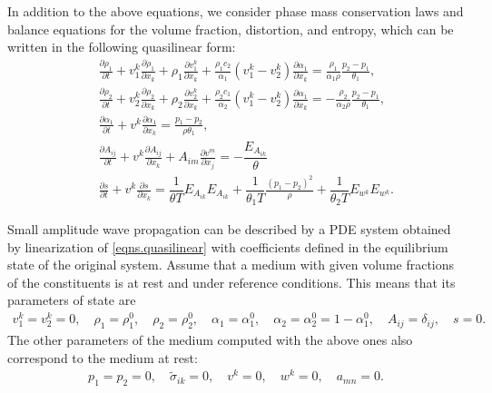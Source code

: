 \documentclass[3p,times,table]{article}
\begin{document}
In addition to the above equations, we consider phase mass conservation 
laws 
and balance equations for the volume fraction, distortion, and entropy, which can be 
written in the following quasilinear form:
\begin{subequations}\label{eqns.quasilinear}
	\begin{eqnarray} 
&&\frac{\partial \rho_1}{\partial t}+v^k_1\frac{\partial \rho_1}{\partial 
x_k}+\rho_1 \frac{\partial v^k_1}{\partial x_k}+
\frac{\rho_1c_2}{\alpha_1}(v^k_1-v^k_2)\frac{\partial \alpha_1}{\partial x_k}=
\frac{\rho_1}{\alpha_1 \rho} \frac{p_2-p_1}{\theta_1},   \\
&&\frac{\partial \rho_2}{\partial t}+v^k_2\frac{\partial \rho_2}{\partial 
x_k}+\rho_2 \frac{\partial v^k_2}{\partial x_k}+
\frac{\rho_2c_1}{\alpha_2}(v^k_1-v^k_2)\frac{\partial \alpha_1}{\partial x_k}=
-\frac{\rho_2}{\alpha_2 \rho} \frac{p_2-p_1}{\theta_1},   \\
&&\frac{\partial \alpha_1}{\partial t}+v^k\frac{\partial \alpha_1}{\partial 
x_k}=
\frac{p_1-p_2}{\rho \theta_1},  \\
&&\frac{\partial A_{i j}}{\partial t}+v^k \frac{\partial A_{ij}}{\partial x_k}
+A_{im}\frac{\partial v^m}{\partial x_j}
=-\dfrac{ E_{A_{ik}} }{\theta}  \\
&&\frac{\partial s}{\partial t}+v^k\frac{\partial s}{\partial x_k}=
\dfrac{1}{\theta T} E_{A_{ik}}E_{A_{ik}} +
\dfrac{1}{\theta_1 T}\frac{(p_1-p_2)^2}{\rho} +
\dfrac{1}{\theta_2 T} E_{w^k}E_{w^k}.  
\end{eqnarray}

\end{subequations}

Small amplitude wave propagation can be described by a PDE system obtained by 
linearization of \eqref{eqns.quasilinear} with coefficients defined in 
the equilibrium state of the original system. Assume that a medium with 
given volume fractions of the constituents is at rest and under reference 
conditions. This means that its parameters of state are
\begin{align}  \label{static.solution}
v_1^k=v_2^k=0, \quad \rho_1=\rho_1^0, \quad \rho_2=\rho_2^0, 
\quad \alpha_1=\alpha_1^0, \quad \alpha_2=\alpha_2^0 = 1-\alpha_1^0, \quad A_{ij}=\delta_{ij}, \quad s=0.  
\end{align}  
The other parameters of the medium computed with the above ones also correspond to the medium at rest:
\begin{align}
p_1=p_2=0, \quad \tilde \sigma_{ik}=0, \quad v^k=0, \quad w^k=0, \quad a_{mn}=0.
\end{align}
\end{document}
